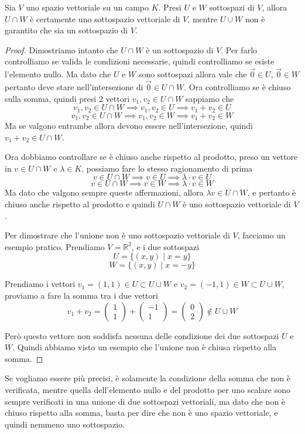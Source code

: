 \documentclass{rapport}
\begin{document}
\begin{teorema}{}{}
  Sia $V$ uno spazio vettoriale su un campo $K$. Presi $U$ e $W$ sottospazi di $V$, allora $U \cap W$ è certamente uno sottospazio vettoriale di $V$, mentre $U \cup W$ non è garantito che sia un sottospazio di $V$. 
\end{teorema}

\begin{proof}
  Dimostriamo intanto che $U\cap W$ è un sottospazio di $V$. Per farlo controlliamo se valida le condizioni necessarie, quindi controlliamo se esiste l'elemento nullo. Ma dato che $U$ e $W$ sono sottospazi allora vale che $\vec{0} \in U$, $\vec{0} \in W$ pertanto deve stare nell'intersezione di $\vec{0} \in U \cap W$. Ora controlliamo se è chiuso sulla somma, quindi presi 2 vettori $v_1, v_2 \in U\cap W$ sappiamo che 
  \[
  v_1, v_2 \in U \cap W \implies v_1, v_2 \in U \implies v_1+v_2 \in U
  \]
  \[
  v_1, v_2 \in U \cap W \implies v_1, v_2 \in W \implies v_1+v_2 \in W
  \]
  Ma se valgono entrambe allora devono essere nell'intersezione, quindi $v_1+v_2\in U\cap W$.
  
  \newpage
  Ora dobbiamo controllare se è chiuso anche rispetto al prodotto, preso un vettore in $v \in U\cap W$ e $\lambda \in K$, possiamo fare lo stesso ragionamento di prima
  \[
  v \in U \cap W \implies v \in U \implies \lambda \cdot v \in U
  \]\[
  v \in U \cap W \implies v \in W \implies \lambda \cdot v \in W
  \]
  Ma dato che valgono sempre queste affermazioni, allora $\lambda v \in U \cap W$, e pertanto è chiuso anche rispetto al prodotto e quindi $U \cap W $ è uno sottospazio vettoriale di $V$.


  Per dimostrare che l'unione non è uno sottospazio vettoriale di $V$, facciamo un esempio pratico. Prendiamo $V = \mathbb{R}^2$, e i due sottospazi 
  \[
  U  = \{(x,y) \; |\; x = y \}
  \]
   \[
  W  = \{(x,y) \; |\; x = -y \}
  \]

  Prendiamo i vettori $v_1 = (1, 1) \in U \subset U \cup W$ e $v_2 = (-1, 1) \in W \subset U \cup W$, proviamo a fare la somma tra i due vettori
  \[
  v_1 + v_2 = \begin{pmatrix}
    1\\
    1
  \end{pmatrix}+\begin{pmatrix}
    -1\\
    1
  \end{pmatrix} = 
  \begin{pmatrix}
    0\\
    2
  \end{pmatrix}
  \notin U \cup W
  \] 

  Però questo vettore non soddisfa nessuna delle condizione dei due sottospazi $U$ e $W$. Quindi abbiamo visto un esempio che l'unione non è chiusa rispetto alla somma.
\end{proof}
 Se vogliamo essere più precisi, è solamente la condizione della somma che non è verificata, mentre quella dell'elemento nullo e del prodotto per uno scalare sono sempre verificati in una unione di due sottospazi vettoriali, ma dato che non è chiuso rispetto alla somma, basta per dire che non è uno spazio vettoriale, e quindi nemmeno uno sottospazio.  
\end{document}

